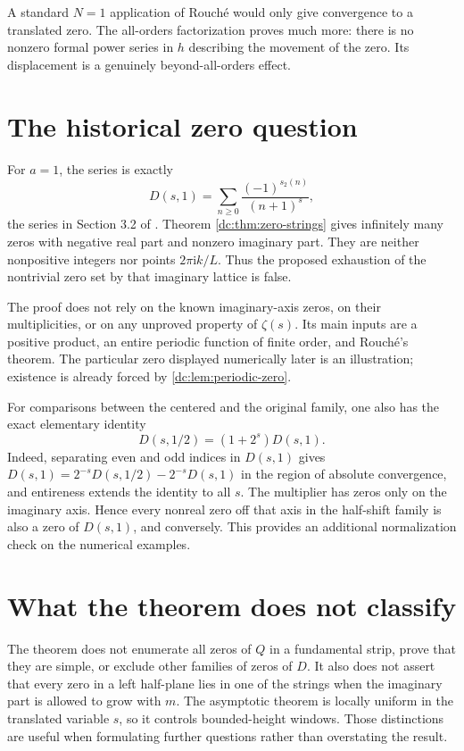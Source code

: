 \documentclass[11pt,a4paper,oneside,openany]{book}
\numberwithin{equation}{chapter}
\theoremstyle{definition}
\theoremstyle{remark}
\newcommand{\ii}{\mathrm i}
\begin{document}
A standard $N=1$ application of Rouch\'e would only give convergence
to a translated zero. The all-orders factorization proves much more:
there is no nonzero formal power series in $h$ describing the
movement of the zero. Its displacement is a genuinely
beyond-all-orders effect.

\section{The historical zero question}
For $a=1$, the series is exactly
\[
 D(s,1)=\sum_{n\ge0}\frac{(-1)^{s_2(n)}}{(n+1)^s},
\]
the series in Section 3.2 of \cite{allouche2015}.
Theorem \ref{dc:thm:zero-strings} gives infinitely many zeros with
negative real part and nonzero imaginary part. They are neither
nonpositive integers nor points $2\pi\ii k/L$. Thus the proposed
exhaustion of the nontrivial zero set by that imaginary lattice is
false.

The proof does not rely on the known imaginary-axis zeros, on their
multiplicities, or on any unproved property of $\zeta(s)$. Its main
inputs are a positive product, an entire periodic function of finite
order, and Rouch\'e's theorem. The particular zero displayed
numerically later is an illustration; existence is already forced by
\cref{dc:lem:periodic-zero}.

For comparisons between the centered and the original family, one
also has the exact elementary identity
\begin{equation}
 \boxed{D(s,1/2)=(1+2^s)D(s,1).}
 \label{dc:eq:half-one}
\end{equation}
Indeed, separating even and odd indices in $D(s,1)$ gives
$D(s,1)=2^{-s}D(s,1/2)-2^{-s}D(s,1)$ in the region of absolute
convergence, and entireness extends the identity to all $s$.
The multiplier has zeros only on the imaginary axis. Hence every
nonreal zero off that axis in the half-shift family is also a zero
of $D(s,1)$, and conversely. This provides an additional normalization
check on the numerical examples.

\section{What the theorem does not classify}
The theorem does not enumerate all zeros of $Q$ in a fundamental
strip, prove that they are simple, or exclude other families of
zeros of $D$. It also does not assert that every zero in a left
half-plane lies in one of the strings when the imaginary part is
allowed to grow with $m$. The asymptotic theorem is locally uniform
in the translated variable $s$, so it controls bounded-height
windows. Those distinctions are useful when formulating further
questions rather than overstating the result.
\end{document}
